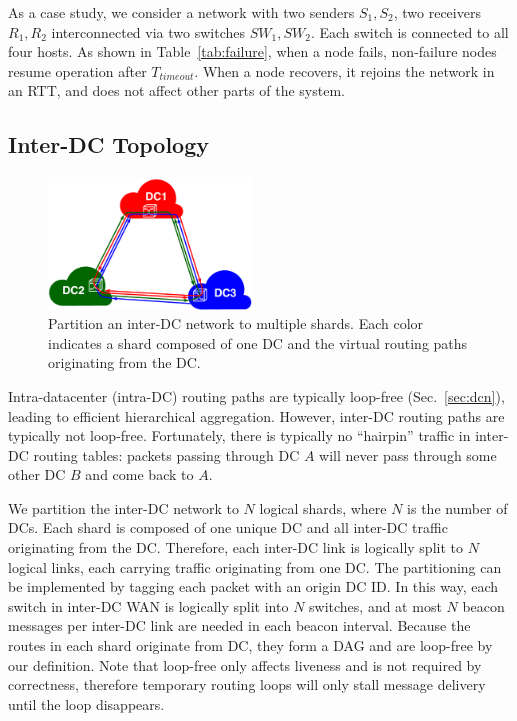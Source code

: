 {As a case study, we consider a network with two senders $S_1, S_2$, two receivers $R_1, R_2$ interconnected via two switches $SW_1, SW_2$.
Each switch is connected to all four hosts.
As shown in Table~\ref{tab:failure}, when a node fails, non-failure nodes resume operation after $T_{timeout}$. When a node recovers, it rejoins the network in an RTT, and does not affect other parts of the system.

\fi





\iffalse
\subsection{Inter-DC Topology}
\label{sec:inter-dc}


\begin{figure}[t]
\centering
\includegraphics[width=0.48\textwidth]{images/inter-DC.pdf}
\caption{
	Partition an inter-DC network to multiple shards.
	Each color indicates a shard composed of one DC and the virtual routing paths originating from the DC.
}
\label{fig:inter-dc}
\end{figure}



Intra-datacenter (intra-DC) routing paths are typically loop-free (Sec.~\ref{sec:dcn}), leading to efficient hierarchical aggregation.
However, inter-DC routing paths are typically not loop-free.
Fortunately, there is typically no ``hairpin'' traffic in inter-DC routing tables: packets passing through DC $A$ will never pass through some other DC $B$ and come back to $A$.

We partition the inter-DC network to $N$ logical shards, where $N$ is the number of DCs.
Each shard is composed of one unique DC and all inter-DC traffic originating from the DC.
Therefore, each inter-DC link is logically split to $N$ logical links, each carrying traffic originating from one DC.
The partitioning can be implemented by tagging each packet with an origin DC ID.
In this way, each switch in inter-DC WAN is logically split into $N$ switches, and at most $N$ beacon messages per inter-DC link are needed in each beacon interval.
Because the routes in each shard originate from  DC, they form a DAG and are loop-free by our definition.
Note that loop-free only affects liveness and is not required by correctness, therefore temporary routing loops will only stall message delivery until the loop disappears.

}
